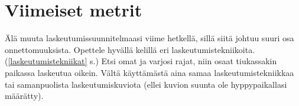 \section{ Viimeiset metrit }
\label{hyppytapahtuma-kuvunkasittelyhypyilla-viimeiset-metrit}


Älä muuta laskeutumissuunnitelmaasi viime hetkellä, sillä siitä johtuu suuri osa onnettomuuksista. Opettele hyvällä kelillä eri laskeutumistekniikoita. (\ref{laskeutumistekniikat} s.\pageref{laskeutumistekniikat}) Etsi omat ja varjosi rajat, niin osaat tiukassakin paikassa laskeutua oikein. Vältä käyttämästä aina samaa laskeutumistekniikkaa tai samanpuolista laskeutumiskuviota (ellei kuvion suunta ole hyppypaikallasi määrätty). 

